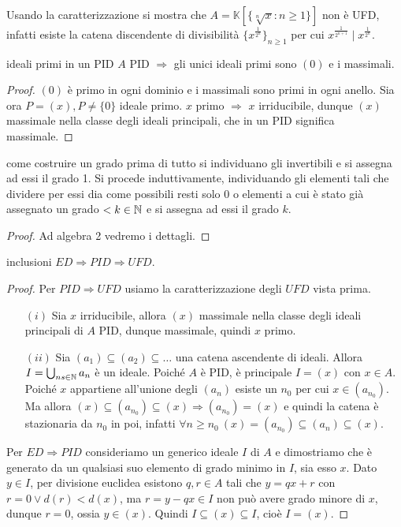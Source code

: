 \begin{example}
    Usando la caratterizzazione si mostra che $A = \mathbb{K}[ \{ \sqrt[n]{x} : n \ge 1 \} ]$ non è UFD, infatti esiste la catena discendente di divisibilità $\{ x^{\frac{1}{2^n}} \}_{n \ge 1}$ per cui $x^{\frac1{2^{n+1}}} \mid x^{\frac1{2^n}}$.
\end{example}
\begin{theorem}{ideali primi in un PID}
    $A$ PID $\Rightarrow$ gli unici ideali primi sono $(0)$ e i massimali.
\end{theorem}
\begin{proof}
    $(0)$ è primo in ogni dominio e i massimali sono primi in ogni anello. Sia ora $P = (x), P \neq \{ 0 \}$ ideale primo. $x$ primo $\Rightarrow$ $x$ irriducibile, dunque $(x)$ massimale nella classe degli ideali principali, che in un PID significa massimale.
\end{proof}
\begin{proposition}{come costruire un grado}
    prima di tutto si individuano gli invertibili e si assegna ad essi il grado 1. Si procede induttivamente, individuando gli elementi tali che dividere per essi dia come possibili resti solo 0 o elementi a cui è stato già assegnato un grado $< k \in \mathbb{N}$ e si assegna ad essi il grado $k$.
\end{proposition}
\begin{proof}
    Ad algebra 2 vedremo i dettagli.
\end{proof}
\begin{theorem}{inclusioni}
    $ED \Rightarrow PID \Rightarrow UFD$.
\end{theorem}
\begin{proof}
    Per $PID \Rightarrow UFD$ usiamo la caratterizzazione degli $UFD$ vista prima. 
    \begin{itemize}
        \item[$(i)$] Sia $x$ irriducibile, allora $(x)$ massimale nella classe degli ideali principali di $A$ PID, dunque massimale, quindi $x$ primo.
        \item[$(ii)$] Sia $(a_1) \subseteq (a_2) \subseteq \dots$ una catena ascendente di ideali. Allora $I = \bigcup_{ns \in \mathbb{N}} a_n$ è un ideale. Poiché $A$ è PID, è principale $I = (x)$ con $x \in A$. Poiché $x$ appartiene all'unione degli $(a_n)$ esiste un $n_0$ per cui $x \in (a_{n_0})$. Ma allora $(x) \subseteq (a_{n_0}) \subseteq (x) \Rightarrow (a_{n_0}) = (x)$ e quindi la catena è stazionaria da $n_0$ in poi, infatti $\forall n \ge n_0 \ (x) = (a_{n_0}) \subseteq (a_n) \subseteq (x)$.
    \end{itemize}
    Per $ED \Rightarrow PID$ consideriamo un generico ideale $I$ di $A$ e dimostriamo che è generato da un qualsiasi suo elemento di grado minimo in $I$, sia esso $x$. Dato $y \in I$, per divisione euclidea esistono $q,r \in A$ tali che $y = qx+r$ con $r = 0 \lor d(r) < d(x)$, ma $r = y-qx \in I$ non può avere grado minore di $x$, dunque $r = 0$, ossia $y \in (x)$. Quindi $I \subseteq (x) \subseteq I$, cioè $I = (x)$.
\end{proof}
